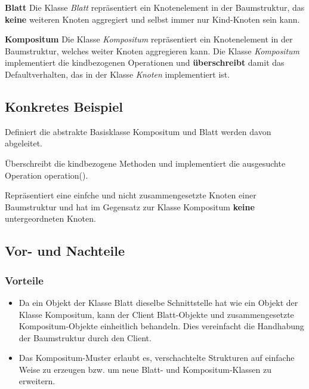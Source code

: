 \documentclass[12pt,a4paper,titlepage]{article}
\theoremstyle{definition}
\begin{document}
\textbf{Blatt}
\newline
Die Klasse \textit{Blatt} repräsentiert ein Knotenelement in der Baumstruktur, das \textbf{keine} weiteren Knoten aggregiert und selbst immer nur Kind-Knoten sein kann.
\newline

\textbf{Kompositum}
\newline
Die Klasse \textit{Kompositum} repräsentiert ein Knotenelement in der Baumstruktur, welches weiter Knoten aggregieren kann. Die Klasse \textit{Kompositum} implementiert die kindbezogenen Operationen und \textbf{überschreibt} damit das Defaultverhalten, das in der Klasse \textit{Knoten} implementiert ist.

\newpage

\subsection{Konkretes Beispiel}


Definiert die abstrakte Basisklasse Kompositum und Blatt werden davon abgeleitet.
\newpage


Überschreibt die kindbezogene Methoden und implementiert die ausgesuchte Operation operation().
\newpage


Repräsentiert eine einfche und nicht zusammengesetzte Knoten einer Baumstruktur und hat im Gegensatz zur Klasse Kompositum \textbf{keine} untergeordneten Knoten.

\subsection{Vor- und Nachteile}
\subsubsection{Vorteile}
\begin{itemize}
	\item Da ein Objekt der Klasse Blatt dieselbe Schnittstelle hat wie ein Objekt der Klasse Kompositum, kann der Client Blatt-Objekte und zusammengesetzte
	Kompositum-Objekte einheitlich behandeln. Dies vereinfacht die Handhabung der Baumstruktur durch den Client.
	\item Das Kompositum-Muster erlaubt es, verschachtelte Strukturen auf einfache Weise zu erzeugen bzw. um neue Blatt- und Kompositum-Klassen zu erweitern.
\end{itemize}
\end{document}
